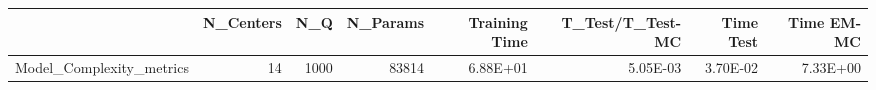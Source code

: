 \begin{tabular}{lrrrrrrr}
\toprule
{} &  N\_Centers &   N\_Q &  N\_Params &  Training Time &  T\_Test/T\_Test-MC &  Time Test &  Time EM-MC \\
\midrule
Model\_Complexity\_metrics &         14 &  1000 &     83814 &       6.88E+01 &          5.05E-03 &   3.70E-02 &    7.33E+00 \\
\bottomrule
\end{tabular}
